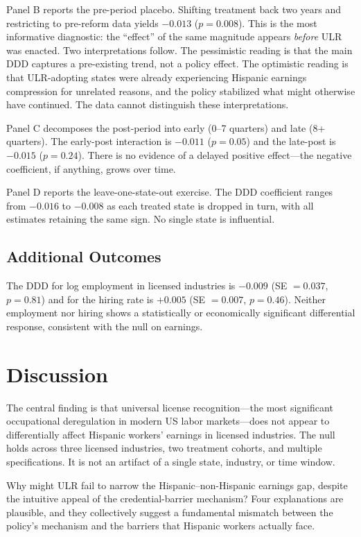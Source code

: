 \documentclass[12pt]{article}
\begin{document}
Panel B reports the pre-period placebo. Shifting treatment back two years and restricting to pre-reform data yields $-0.013$ ($p = 0.008$). This is the most informative diagnostic: the ``effect'' of the same magnitude appears \textit{before} ULR was enacted. Two interpretations follow. The pessimistic reading is that the main DDD captures a pre-existing trend, not a policy effect. The optimistic reading is that ULR-adopting states were already experiencing Hispanic earnings compression for unrelated reasons, and the policy stabilized what might otherwise have continued. The data cannot distinguish these interpretations.

Panel C decomposes the post-period into early (0--7 quarters) and late (8+ quarters). The early-post interaction is $-0.011$ ($p = 0.05$) and the late-post is $-0.015$ ($p = 0.24$). There is no evidence of a delayed positive effect---the negative coefficient, if anything, grows over time.

Panel D reports the leave-one-state-out exercise. The DDD coefficient ranges from $-0.016$ to $-0.008$ as each treated state is dropped in turn, with all estimates retaining the same sign. No single state is influential.

\subsection{Additional Outcomes}

The DDD for log employment in licensed industries is $-0.009$ (SE $= 0.037$, $p = 0.81$) and for the hiring rate is $+0.005$ (SE $= 0.007$, $p = 0.46$). Neither employment nor hiring shows a statistically or economically significant differential response, consistent with the null on earnings.

\section{Discussion}

The central finding is that universal license recognition---the most significant occupational deregulation in modern US labor markets---does not appear to differentially affect Hispanic workers' earnings in licensed industries. The null holds across three licensed industries, two treatment cohorts, and multiple specifications. It is not an artifact of a single state, industry, or time window.

Why might ULR fail to narrow the Hispanic--non-Hispanic earnings gap, despite the intuitive appeal of the credential-barrier mechanism? Four explanations are plausible, and they collectively suggest a fundamental mismatch between the policy's mechanism and the barriers that Hispanic workers actually face.
\end{document}
